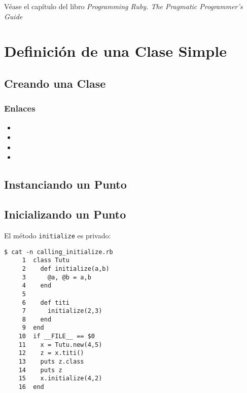
Véase el capítulo
del libro {\it Programming Ruby.  The Pragmatic Programmer's Guide}

\section{Definición de una Clase Simple}

\subsection{Creando una Clase}

\subsubsection{Enlaces}
\begin{itemize}
  \item {}
  \item {}
  \item {}
  \item {}
\end{itemize}

\subsection{Instanciando un Punto}

\subsection{Inicializando un Punto}

El método \verb|initialize| es privado:

\begin{verbatim}
$ cat -n calling_initialize.rb 
     1  class Tutu
     2    def initialize(a,b)
     3      @a, @b = a,b
     4    end
     5  
     6    def titi
     7      initialize(2,3)
     8    end
     9  end
    10  if __FILE__ == $0
    11    x = Tutu.new(4,5)
    12    z = x.titi()
    13    puts z.class
    14    puts z
    15    x.initialize(4,2)
    16  end
\end{verbatim}

